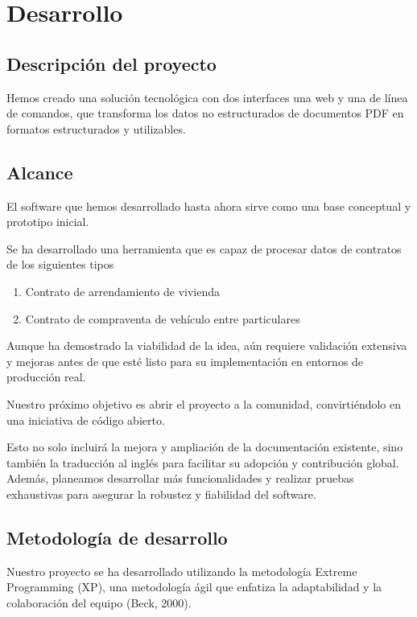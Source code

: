 \chapter{Desarrollo}\label{ch:chapter_3}


\section{Descripción del proyecto}

Hemos creado una solución tecnológica con dos interfaces una web y una de línea de comandos, que transforma los datos no
estructurados de documentos PDF en formatos estructurados y utilizables.


\section{Alcance}

El software que hemos desarrollado hasta ahora sirve como una base conceptual y prototipo inicial.

Se ha desarrollado una herramienta que es capaz de procesar datos de contratos de los siguientes tipos

\begin{enumerate}
    \item Contrato de arrendamiento de vivienda
    \item Contrato de compraventa de vehículo entre particulares
\end{enumerate}

Aunque ha demostrado la viabilidad de la idea, aún requiere validación extensiva y mejoras antes de que esté listo para
su implementación en entornos de producción real.

Nuestro próximo objetivo es abrir el proyecto a la comunidad, convirtiéndolo en una iniciativa de código abierto.

Esto no solo incluirá la mejora y ampliación de la documentación existente, sino también la traducción al inglés para
facilitar su adopción y contribución global.
Además, planeamos desarrollar más funcionalidades y realizar pruebas exhaustivas para asegurar la robustez y fiabilidad
del software.


\section{Metodología de desarrollo}

Nuestro proyecto se ha desarrollado utilizando la metodología Extreme
Programming (XP), una metodología ágil que enfatiza la adaptabilidad y la colaboración del equipo (Beck, 2000).

